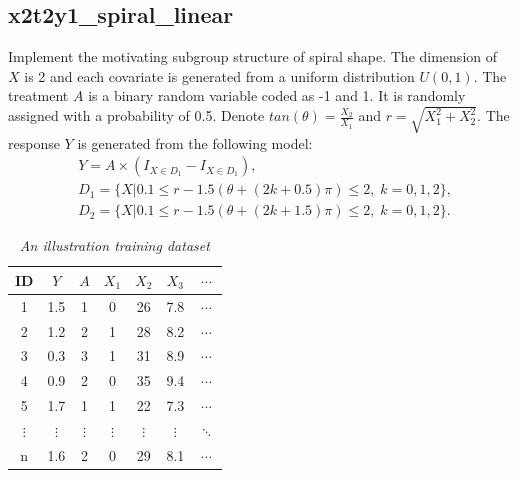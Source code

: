 \documentclass[12pt]{article}
\begin{document}
\subsection*{x2t2y1\_spiral\_linear}
Implement the motivating subgroup structure of spiral shape. The dimension of $X$ is 2 and each covariate is generated from a uniform distribution $U(0,1)$. The treatment $A$ is a binary random variable coded as -1 and 1. It is randomly assigned with a probability of 0.5.
Denote $tan(\theta) = \frac{X_2}{X_1}$ and $r = \sqrt{X_1^2+X_2^2}$.
The response $Y$ is generated from the following model: 
\begin{align*}
&Y = A\times (I_{X\in D_1}-I_{X\in D_1}) , \\
&D_1 = \big\{X|0.1\leq r - 1.5(\theta+(2k+0.5)\pi)\leq 2,\;k=0,1,2 \big\}, \\
&D_2 = \big\{X|0.1\leq r - 1.5(\theta+(2k+1.5)\pi)\leq 2,\;k=0,1,2 \big\}.
\end{align*}






\newpage

\begin{table}[htbp]
  \centering
  \caption{\emph{An illustration training dataset}}
    \begin{tabular}{c|c|c|cccc}
    \hline
    \hline
    ID & $Y$     & $A$   & $X_1$    & $X_2$    & $X_3$    & $\cdots$ \\
    \hline
    1&1.5  & 1     & 0     & 26    & 7.8   & $\cdots$ \\
    2&1.2  & 2     & 1     & 28    & 8.2   & $\cdots$  \\
    3&0.3  & 3     & 1     & 31    & 8.9   & $\cdots$  \\
    4&0.9  & 2     & 0     & 35    & 9.4   & $\cdots$  \\
    5&1.7  & 1     & 1     & 22    & 7.3   & $\cdots$  \\
    $\vdots$ & $\vdots$    & $\vdots$    & $\vdots$   & $\vdots$     & $\vdots$     & $\ddots$  \\
    n & 1.6 & 2 & 0 & 29 & 8.1 & $\cdots$ \\
    \hline
    \hline
    \end{tabular}%
  \label{tab:TrainingDataExample}%
\end{table}%
\end{document}
